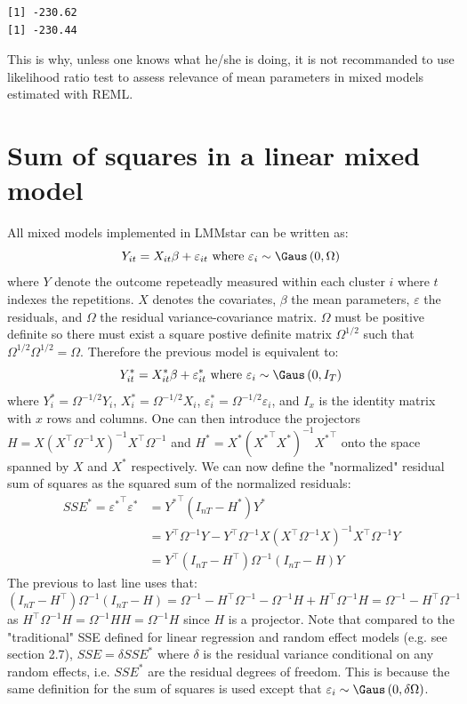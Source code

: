 \documentclass[12pt]{article}
\newcommand\trans[1]{{#1}^\intercal}%
\begin{document}
\label{}
\begin{verbatim}
[1] -230.62
[1] -230.44
\end{verbatim}


This is why, unless one knows what he/she is doing, it is not
recommanded to use likelihood ratio test to assess relevance of mean
parameters in mixed models estimated with REML.

\clearpage
\section{Sum of squares in a linear mixed model}
\label{SM:sumSquares}
All mixed models implemented in LMMstar can be written as:
\[ Y_{it} = X_{it}\beta + \varepsilon_{it} \text{ where } \varepsilon_{i} \sim \Gaus\left(0,\Omega\right)\]
where \(Y\) denote the outcome repeteadly measured within each cluster
\(i\) where \(t\) indexes the repetitions. \(X\) denotes the
covariates, \(\beta\) the mean parameters, \(\varepsilon\) the
residuals, and \(\Omega\) the residual variance-covariance matrix.
\(\Omega\) must be positive definite so there must exist a square
postive definite matrix \(\Omega^{1/2}\) such that
\(\Omega^{1/2}\Omega^{1/2} = \Omega\). Therefore the previous model is
equivalent to:
\[ Y^*_{it} = X^*_{it}\beta + \varepsilon^*_{it} \text{ where } \varepsilon_{i} \sim \Gaus\left(0,I_T\right)\]
where \(Y^*_{i} = \Omega^{-1/2} Y_{i}\), \(X^*_{i} = \Omega^{-1/2}
X_{i}\), \(\varepsilon^*_{i} = \Omega^{-1/2} \varepsilon_{i}\), and
\(I_x\) is the identity matrix with \(x\) rows and columns. One can
then introduce the projectors \(H= X \left(\trans{X}\Omega^{-1}
X\right)^{-1}\trans{X} \Omega^{-1}\) and \(H^*= X^*
\left(\trans{X^*}X^*\right)^{-1}\trans{X^*}\) onto the space spanned
by \(X\) and \(X^*\) respectively. We can now define the "normalized"
residual sum of squares as the squared sum of the normalized
residuals:
\begin{align*}
SSE^* = \trans{\varepsilon^*} \varepsilon^* &= \trans{Y^*} (I_{nT}-H^*) Y^* \\
&= \trans{Y} \Omega^{-1} Y - \trans{Y} \Omega^{-1} X \left(\trans{X}\Omega^{-1} X\right)^{-1} \trans{X} \Omega^{-1} Y \\
&= \trans{Y} (I_{nT}-\trans{H}) \Omega^{-1} (I_{nT}-H) Y 
\end{align*}
The previous to last line uses that: \((I_{nT}-\trans{H}) \Omega^{-1}
(I_{nT}-H)= \Omega^{-1} - \trans{H} \Omega^{-1} - \Omega^{-1}H +
\trans{H} \Omega^{-1} H = \Omega^{-1} - \trans{H}\Omega^{-1}\) as
\(\trans{H} \Omega^{-1} H = \Omega^{-1}HH=\Omega^{-1}H\) since \(H\)
is a projector. Note that compared to the "traditional" SSE defined
for linear regression and random effect models (e.g. see
\cite{christensen2002plane} section 2.7), \(SSE=\delta SSE^{*}\) where
\(\delta\) is the residual variance conditional on any random effects,
i.e. \(SSE^{*}\) are the residual degrees of freedom. This is because
the same definition for the sum of squares is used except that
\(\varepsilon_{i} \sim \Gaus\left(0,\delta\Omega\right)\).
\end{document}
